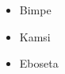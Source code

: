 \documentclass{article}
\begin{document}
	\begin{itemize}
		\item Bimpe
		\item Kamsi
		\item Eboseta
	\end{itemize}
\end{document}
